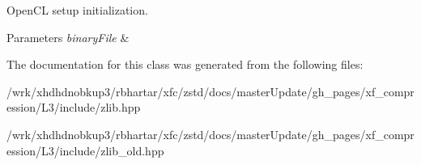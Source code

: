 Open\-C\-L setup initialization. 


\begin{DoxyParams}{Parameters}
{\em binary\-File} & \\
\hline
\end{DoxyParams}


The documentation for this class was generated from the following files\-:\begin{DoxyCompactItemize}
\item 
/wrk/xhdhdnobkup3/rbhartar/xfc/zstd/docs/master\-Update/gh\-\_\-pages/xf\-\_\-compression/\-L3/include/zlib.\-hpp\item 
/wrk/xhdhdnobkup3/rbhartar/xfc/zstd/docs/master\-Update/gh\-\_\-pages/xf\-\_\-compression/\-L3/include/zlib\-\_\-old.\-hpp\end{DoxyCompactItemize}
